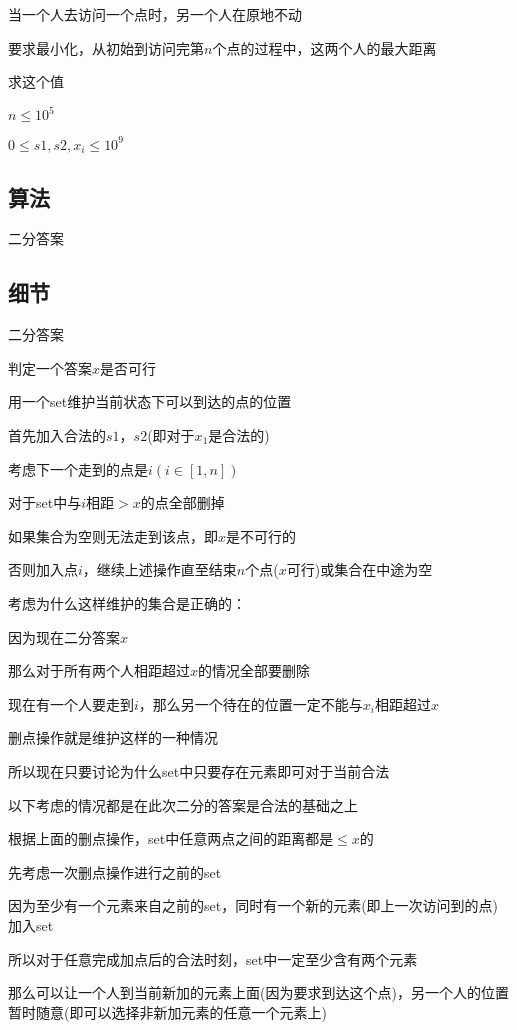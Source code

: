 \documentclass[a4paper]{article}
\begin{document}
		当一个人去访问一个点时，另一个人在原地不动
		
		要求最小化，从初始到访问完第$n$个点的过程中，这两个人的最大距离
		
		求这个值
		
		$n \leq 10^5$
		
		$0 \leq s1 , s2 , x_i \leq 10^9 $
		
	\subsection{算法}
		
		二分答案
		
	\subsection{细节}
		
		二分答案
		
		判定一个答案$x$是否可行
		
		用一个set维护当前状态下可以到达的点的位置
		
		首先加入合法的$s1$，$s2$(即对于$x_1$是合法的)
		
		考虑下一个走到的点是$i(i \in [1,n])$
		
		对于set中与$i$相距$>x$的点全部删掉
		
		如果集合为空则无法走到该点，即$x$是不可行的
		
		否则加入点$i$，继续上述操作直至结束$n$个点($x$可行)或集合在中途为空
		
		考虑为什么这样维护的集合是正确的：
		
		因为现在二分答案$x$
		
		那么对于所有两个人相距超过$x$的情况全部要删除
		
		现在有一个人要走到$i$，那么另一个待在的位置一定不能与$x_i$相距超过$x$
		
		删点操作就是维护这样的一种情况
		
		所以现在只要讨论为什么set中只要存在元素即可对于当前合法
		
		以下考虑的情况都是在此次二分的答案是合法的基础之上
		
		根据上面的删点操作，set中任意两点之间的距离都是$\leq x$的
		
		先考虑一次删点操作进行之前的set
		
		因为至少有一个元素来自之前的set，同时有一个新的元素(即上一次访问到的点)加入set
		
		所以对于任意完成加点后的合法时刻，set中一定至少含有两个元素
		
		那么可以让一个人到当前新加的元素上面(因为要求到达这个点)，另一个人的位置暂时随意(即可以选择非新加元素的任意一个元素上)
		
\end{document}
